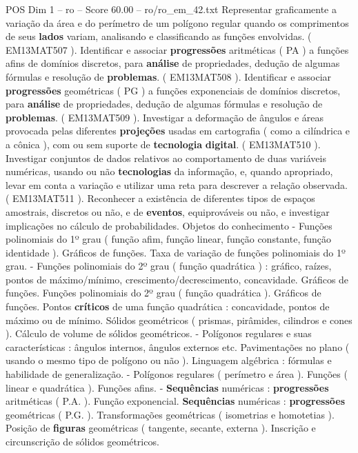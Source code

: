 \begin{textsample}{POS Dim 1 – ro – Score 60.00 – ro/ro\_em\_42.txt}
Representar graficamente a variação da área e do perímetro de um polígono regular quando os comprimentos de seus \textbf{lados} variam, analisando e classificando as funções envolvidas. ( EM13MAT507 ).
Identificar e associar \textbf{progressões} aritméticas ( PA ) a funções afins de domínios discretos, para \textbf{análise} de propriedades, dedução de algumas fórmulas e resolução de \textbf{problemas}. ( EM13MAT508 ).
Identificar e associar \textbf{progressões} geométricas ( PG ) a funções exponenciais de domínios discretos, para \textbf{análise} de propriedades, dedução de algumas fórmulas e resolução de \textbf{problemas}. ( EM13MAT509 ).
Investigar a deformação de ângulos e áreas provocada pelas diferentes \textbf{projeções} usadas em cartografia ( como a cilíndrica e a cônica ), com ou sem suporte de \textbf{tecnologia} \textbf{digital}. ( EM13MAT510 ).
Investigar conjuntos de dados relativos ao comportamento de duas variáveis numéricas, usando ou não \textbf{tecnologias} da informação, e, quando apropriado, levar em conta a variação e utilizar uma reta para descrever a relação observada. ( EM13MAT511 ).
Reconhecer a existência de diferentes tipos de espaços amostrais, discretos ou não, e de \textbf{eventos}, equiprováveis ou não, e investigar implicações no cálculo de probabilidades.
Objetos do conhecimento - Funções polinomiais do 1º grau ( função afim, função linear, função constante, função identidade ).
Gráficos de funções.
Taxa de variação de funções polinomiais do 1º grau. - Funções polinomiais do 2º grau ( função quadrática ) : gráfico, raízes, pontos de máximo/mínimo, crescimento/decrescimento, concavidade.
Gráficos de funções.
Funções polinomiais do 2º grau ( função quadrática ).
Gráficos de funções.
Pontos \textbf{críticos} de uma função quadrática : concavidade, pontos de máximo ou de mínimo.
Sólidos geométricos ( prismas, pirâmides, cilindros e cones ).
Cálculo de volume de sólidos geométricos. - Polígonos regulares e suas características : ângulos internos, ângulos externos etc.
Pavimentações no plano ( usando o mesmo tipo de polígono ou não ).
Linguagem algébrica : fórmulas e habilidade de generalização. - Polígonos regulares ( perímetro e área ).
Funções ( linear e quadrática ).
Funções afins. - \textbf{Sequências} numéricas : \textbf{progressões} aritméticas ( P.A. ).
Função exponencial. \textbf{Sequências} numéricas : \textbf{progressões} geométricas ( P.G. ).
Transformações geométricas ( isometrias e homotetias ).
Posição de \textbf{figuras} geométricas ( tangente, secante, externa ).
Inscrição e circunscrição de sólidos geométricos.

\end{textsample}

